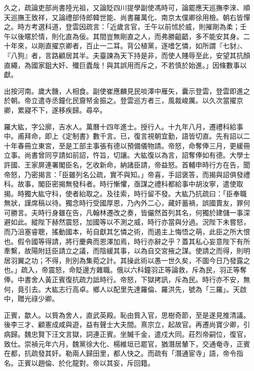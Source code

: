 \begin{pinyinscope}
久之，疏論吏部尚書陸光祖，又論貶四川提學副使馮時可，論罷應天巡撫李淶、順天巡撫王致祥，又論禮部侍郎韓世能、尚書羅萬化、南京太僕卿徐用檢。朝右皆憚之。時方考選科道，登雲因疏言：「近歲言官，壬午以前怵於威，則摧剛為柔；壬午以後暱於情，則化直為佞。其間豈無剛直之人，而弗勝齟齬，多不能安其身。二十年來，以剛直擢京卿者，百止一二耳。背公植黨，逐嗜乞憐，如所謂『七豺』、『八狗』者，言路顧居其半。夫臺諫為天下持是非，而使人賤辱至此，安望其抗顏直繩，為國家鉏大奸、殲巨蠹哉！與其誤用而斥之，不若慎於始進。」因條數事以獻。

出按河南。歲大饑，人相食。副使崔應麟見民啖澤中雁矢，囊示登雲，登雲即進之於朝。帝立遣寺丞鐘化民齎帑金振之。登雲巡方者三，風裁峻厲。以久次當擢京卿，累寢不下，遂移疾歸。尋卒。

羅大紘，字公廓，吉水人。萬曆十四年進士。授行人。十九年八月，遷禮科給事中。甫拜命，即上《定制書》數千言。已，復言視朝宜勤，語皆切直。先有詔以二十年春冊立東宮，至是工部主事張有德以預備儀物請。帝怒，命奪俸三月，更緩冊立事。尚書曾同亨請如前詔，忤旨，切讓。大紘復以為言，詔奪俸如有德。大學士許國、王家屏連署閣臣名，乞收新命，納諸臣請，帝益怒。首輔申時行方在告，聞帝怒，乃密揭言：「臣雖列名公疏，實不與知。」帝喜，手詔褒答，而揭與詔俱發禮科。故事，閣臣密揭無發科者。時行慚懼，亟謀之禮科都給事中胡汝寧，遣使取揭。時獨大紘守科，使者紿取之。及往索，時行留不發。大紘乃抗疏曰：「臣奉職無狀，謹席稿以待。獨念時行受國厚恩，乃內外二心，藏奸蓄禍，誤國賣友，罪何可勝言。夫時行身雖在告，凡翰林遷改之奏，皆儼然首列其名，何獨於建儲一事深避如此。縱陛下赫然震怒，加國等以不測之威，時行亦當與分過。況陛下未嘗怒，而乃沮塞睿聰，搖動國本，茍自獻其乞憐之術，而遏主上悔悟之萌，此臣之所大恨也。假令國等得請，將行慶典而恩澤加焉，時行亦辭之乎？蓋其私心妄意陛下有所牽繫，故陽附廷臣請立之議，而陰緩其事，以為自交宮掖之謀。使請之而得，則明居羽翼之功；不得，則別為集菀之計。其操此術以愚一世久矣，不圖今日乃發露之也。」疏入，帝震怒，命貶邊方雜職。俄以六科鐘羽正等論救，斥為民，羽正等奪俸。中書舍人黃正賓復抗疏力詆時行。帝怒，下獄拷訊，斥為民。時行亦不安，無何，竟引去。大紘志行高卓。鄉人以配里先達羅倫、羅洪先，號為「三羅」。天啟中，贈光祿少卿。

正賓，歙人。以貲為舍人，直武英殿。恥由貲入官，思樹奇節，至是遂見推清議。後李三才、顧憲成咸與遊，益有聲士大夫間。熹宗立，起故官。再遷尚寶少卿，引病歸。魏忠賢下汪文言獄，詞連正賓。坐贓千金，遣戍大同。莊烈帝嗣位，復官，致仕。崇禎元年六月，魏黨徐大化、楊維垣已罷官，猶潛居輦下，交通奄寺，正賓在都，抗疏發其奸。勒兩人歸田里，都人快之。而疏有「潛通宦寺」語，帝令指名。正賓以趙倫、於化龍對。帝以其妄，斥回籍。


\end{pinyinscope}
